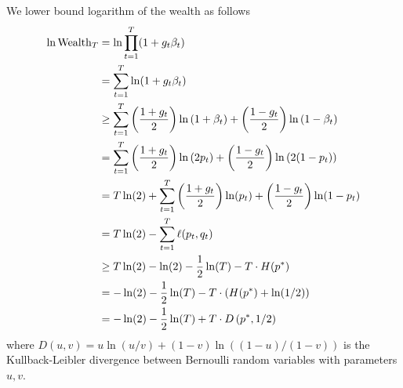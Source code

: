 We lower bound logarithm of the wealth as follows
\allowdisplaybreaks
\begin{align*}
\ln \operatorname{Wealth}_T
& = \ln \prod_{t=1}^T (1 + g_t\beta_t) \\
& =  \sum_{t=1}^T \ln (1 + g_t\beta_t) \\
& \ge  \sum_{t=1}^T \left( \frac{1+g_t}{2} \right) \ln \left(1 + \beta_t\right) + \left( \frac{1-g_t}{2} \right) \ln \left(1 - \beta_t \right) \\
& =  \sum_{t=1}^T \left( \frac{1+g_t}{2} \right) \ln \left(2p_t \right) + \left( \frac{1-g_t}{2} \right) \ln \left(2 (1 - p_t) \right) \\
& =  T \ln(2) + \sum_{t=1}^T \left( \frac{1+g_t}{2} \right) \ln (p_t) + \left( \frac{1-g_t}{2} \right) \ln (1 - p_t) \\
& =  T \ln(2) - \sum_{t=1}^T \ell(p_t, q_t) \\
& \ge  T \ln(2) - \ln(2) - \frac{1}{2} \ln(T) - T \cdot H(p^*) \\
& =  - \ln(2) - \frac{1}{2} \ln(T) - T \cdot (H(p^*) + \ln(1/2)) \\
& =  - \ln(2) - \frac{1}{2} \ln(T) + T \cdot D\left(p^*, 1/2 \right)
\end{align*}
where $D(u,v) = u \ln(u/v) + (1-v) \ln((1-u)/(1-v))$ is the Kullback-Leibler divergence
between Bernoulli random variables with parameters $u,v$.




